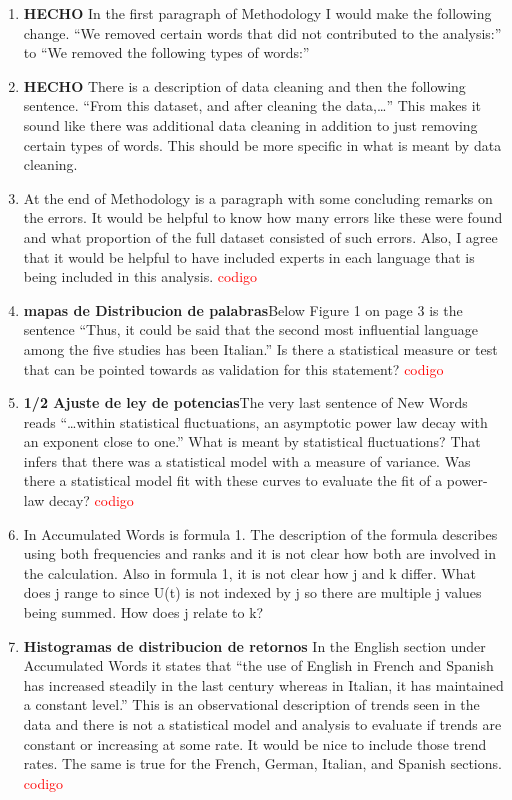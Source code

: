 \documentclass{article}
\begin{document}
\begin{enumerate}
		\item \textbf{HECHO}  In the first paragraph of Methodology I would make the following
		change. “We removed certain words that did not contributed to the
		analysis:” to “We removed the following types of words:”
		
		\item  \textbf{HECHO} There is a description of data cleaning and then the following
		sentence. “From this dataset, and after cleaning the data,…” This
		makes it sound like there was additional data cleaning in addition to
		just removing certain types of words. This should be more specific in
		what is meant by data cleaning.
		
		\item At the end of Methodology is a paragraph with some concluding
		remarks on the errors. It would be helpful to know how many errors
		like these were found and what proportion of the full dataset
		consisted of such errors. Also, I agree that it would be helpful to
		have included experts in each language that is being included in this
		analysis. \textcolor{red}{codigo}
		
		\item \textbf{mapas de Distribucion de palabras}Below Figure 1 on page 3 is the sentence “Thus, it could be said
		that the second most influential language among the five studies has
		been Italian.” Is there a statistical measure or test that can be
		pointed towards as validation for this statement? \textcolor{red}{codigo}
		
		\item \textbf{1/2 Ajuste de ley de potencias}The very last sentence of New Words reads “…within statistical
		fluctuations, an asymptotic power law decay with an exponent close to
		one.” What is meant by statistical fluctuations? That infers that
		there was a statistical model with a measure of variance. Was there a
		statistical model fit with these curves to evaluate the fit of a
		power-law decay? \textcolor{red}{codigo}
		
		\item  In Accumulated Words is formula 1. The description of the formula
		describes using both frequencies and ranks and it is not clear how
		both are involved in the calculation. Also in formula 1, it is not
		clear how j and k differ. What does j range to since U(t) is not
		indexed by j so there are multiple j values being summed. How does j
		relate to k?
		
		\item \textbf{Histogramas de distribucion de retornos }In the English section under Accumulated Words it states that “the
		use of English in French and Spanish has increased steadily in the
		last century whereas in Italian, it has maintained a constant level.”
		This is an observational description of trends seen in the data and
		there is not a statistical model and analysis to evaluate if trends
		are constant or increasing at some rate. It would be nice to include
		those trend rates. The same is true for the French, German, Italian,
		and Spanish sections. \textcolor{red}{codigo}
		

\end{enumerate}
\end{document}
